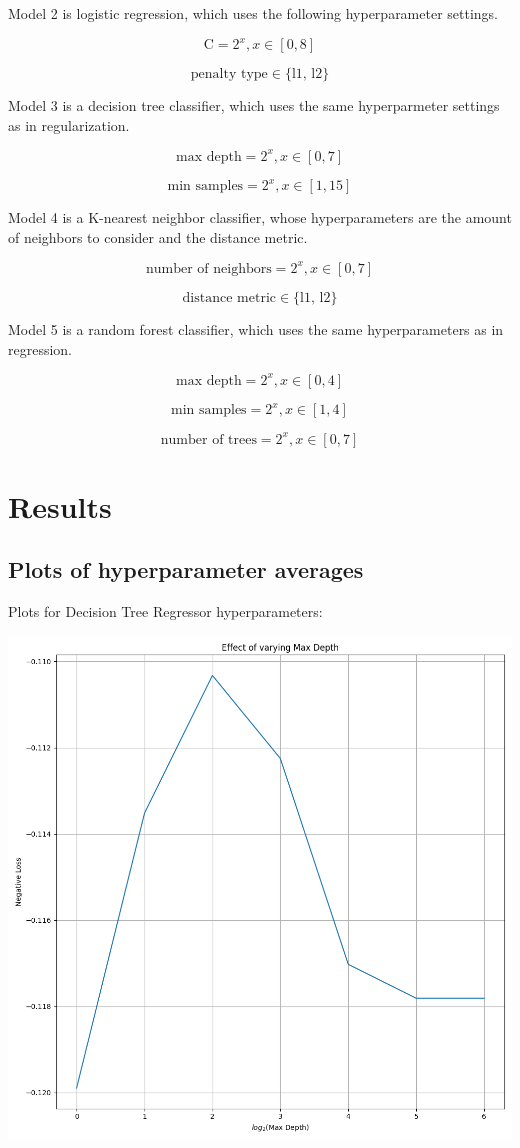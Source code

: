 \documentclass[12pt, letterpaper]{article}
\begin{document}
Model 2 is logistic regression, which uses the following hyperparameter settings.

$$
\text{C} = 2^x, x \in [0,8]
$$

$$
\text{penalty type} \in \{\text{l1, l2}\}
$$

Model 3 is a decision tree classifier, which uses the same hyperparmeter settings as in regularization.

$$
\text{max depth} = 2^x, x \in [0,7]
$$

$$
\text{min samples} = 2^x, x \in [1,15]
$$

Model 4 is a K-nearest neighbor classifier, whose hyperparameters are the amount of neighbors to consider and the distance metric.

$$
\text{number of neighbors} = 2^x, x \in [0,7]
$$

$$
\text{distance metric} \in \{\text{l1, l2}\}
$$

Model 5 is a random forest classifier, which uses the same hyperparameters as in regression.

$$
\text{max depth} = 2^x, x \in [0,4]
$$

$$
\text{min samples} = 2^x, x \in [1,4]
$$

$$
\text{number of trees} = 2^x, x \in [0,7]
$$

\section{Results} %

\subsection{Plots of hyperparameter averages}

\newcommand{\myscale}{0.4}

Plots for Decision Tree Regressor hyperparameters:

\includegraphics[scale=\myscale]{decision_tree_regressor_Max Depth.png}
\end{document}
